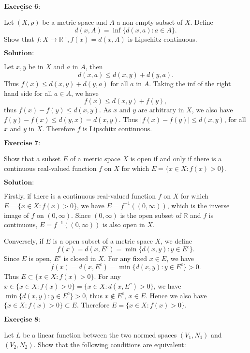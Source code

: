 \documentclass[12pt,a4paper]{ctexart}
\begin{document}
$\underline{\textbf{Exercise 6:}}$

Let $(X, \rho)$ be a metric space and $A$ a non-empty subset of $X$. Define 
$$d(x, A) = \inf \{d(x, a) : a \in A \}.$$
Show that $f: X \to \mathbb R^{+}, f(x) = d(x, A)$ is Lipschitz continuous.

\vspace{8pt}
$\textbf{Solution:}$

Let $x, y$ be in $X$ and $a$ in $A$, then
$$d(x,a) \leq d(x,y) + d(y, a).$$
Thus $f(x) \leq d(x,y) + d(y,a)$ for all $a$ in $A$. Taking the inf of the right hand side for all $a \in A$, we have
$$f(x) \leq d(x, y) + f(y),$$
thus $f(x) - f(y) \leq d(x, y)$. As $x$ and $y$ are arbitrary in $X$, we also have
$f(y) - f(x) \leq d(y,x) = d(x, y)$. Thus $|f(x) - f(y)| \leq d(x, y)$, for all $x$ and $y$ in $X$. Therefore $f$ is Lipschitz continuous.

\newpage


$\underline{\textbf{Exercise 7:}}$

Show that a subset $E$ of a metric space $X$ is open if and only if there is a continuous real-valued function $f$ on $X$ for which $E = \{x \in X: f(x) > 0 \}$.

\vspace{8pt}
$\textbf{Solution:}$

Firstly, if there is a continuous real-valued function $f$ on $X$ for which $E = \{x \in X: f(x) > 0 \}$, we have $E = f^{-1}((0, \infty))$, which is the inverse image of $f$ on $(0, \infty)$. Since $(0, \infty)$ is the open subset of $\mathbb R$ and $f$ is continuous, $E = f^{-1}((0, \infty))$ is also open in $X$.

Conversely, if $E$ is a open subset of a metric space $X$, we define
$$f (x) = d(x, E^c) = \min \{d(x, y): y \in E^c \}.$$
Since $E$ is open, $E^c$ is closed in $X$. For any fixed $x \in E$, we have
$$f (x) = d(x, E^c) = \min \{d(x, y): y \in E^c \} > 0.$$
Thus $E \subset \{x \in X: f(x) > 0 \}$. For any $x \in \{x \in X: f(x) > 0 \} = \{x \in X: d(x, E^c) > 0 \}$, we have $\min \{d(x, y): y \in E^c\} > 0$, thus $x \notin E^c$, $x \in E$. Hence we also have $\{x \in X: f(x) > 0 \} \subset E$. Therefore $E = \{x \in X: f(x) > 0 \}$.



\newpage

$\underline{\textbf{Exercise 8:}}$

Let $L$ be a linear function between the two normed spaces $(V_1, N_1)$ and $(V_2, N_2)$. Show that the following conditions are equivalent:
\end{document}
